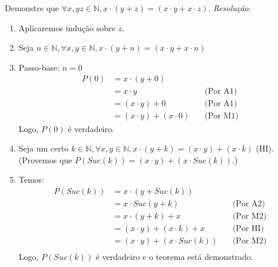 Demonstre que $\forall x,y z \in \mathbb{N}, x \cdot (y + z) = (x \cdot y + x \cdot z)$.
\emph{Resolução.}
\begin{enumerate}
	\item Aplicaremos indução sobre $z$.
	\item Seja $n \in \mathbb{N}, \forall x, y \in \mathbb{N}, x \cdot (y + n) = (x \cdot y + x \cdot n)$
	\item Passo-base: $n = 0$
	\begin{align*}
		P(0) &= x \cdot (y + 0) \\ 
		&= x \cdot y &\quad \text{(Por A1)} \\
		&= (x \cdot y) + 0 &\quad \text{(Por A1)} \\ 
		&= (x \cdot y) + (x \cdot 0) &\quad \text{(Por M1)}
	\end{align*}
	Logo, $P(0)$ é verdadeiro.
	\item Seja um certo $k \in \mathbb{N}, \forall x,y \in \mathbb{N}, x \cdot (y + k) = (x \cdot y) + (x \cdot k)$ (HI). \\
	(Provemos que $P(Suc(k)) = (x \cdot y) + (x \cdot Suc(k))$.)
	\item Temos:
	\begin{align*}
		P(Suc(k)) &= x \cdot (y + Suc(k)) \\
		&= x \cdot Suc(y + k) &\quad \text{(Por A2)} \\  
		&= x \cdot (y + k) + x &\quad \text{(Por M2)} \\  
		&= (x \cdot y) + (x \cdot k) + x &\quad \text{(Por HI)} \\  
		&= (x \cdot y) + (x \cdot Suc(k)) &\quad \text{(Por M2)} \\  
	\end{align*}
	Logo, $P(Suc(k))$ é verdadeiro e o teorema está demonstrado. 
\end{enumerate}
